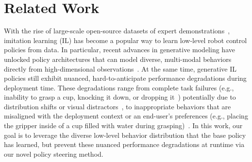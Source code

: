 \section{Related Work}

With the rise of large-scale open-source datasets of expert demonstrations~\citep{droid, rt12022arxiv,  rt22023arxiv,contributors2024agibotworldrepo, fang2023rh20t, open_x_embodiment_rt_x_2023}, imitation learning (IL) has become a popular way to learn low-level robot control policies from data. 
In particular, recent advances in generative modeling have unlocked policy architectures that can model diverse, multi-modal behaviors directly from high-dimensional observations~\citep{chi2024diffusionpolicy,leebehavior,reuss2024multimodal}. 
At the same time, generative IL policies still exhibit nuanced, hard-to-anticipate performance degradations during deployment time.  
These degradations range from complete task failures (e.g., inability to grasp a cup, knocking it down, or dropping it~\citep{nakamoto2024steering}) potentially due to distribution shifts or visual distractors~\citep{hancock2024run,vincent2024generalizable}, to inappropriate behaviors that are misaligned with the deployment context or an end-user's preferences (e.g., placing the gripper inside of a cup filled with water during grasping)~\citep{agiaunpacking}. 
In this work, our goal is to leverage the diverse low-level behavior distribution that the base policy has learned, but prevent these nuanced performance degradations at runtime via our novel policy steering method. 


